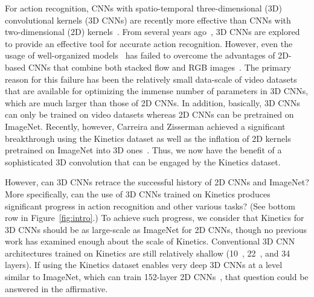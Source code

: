 \documentclass[10pt,twocolumn,letterpaper]{article}
\begin{document}
  For action recognition, CNNs with spatio-temporal three-dimensional (3D) convolutional kernels (3D CNNs)
  are recently more effective than CNNs with two-dimensional (2D) kernels~\cite{I3D}.
  From several years ago~\cite{Ji2013},
  3D CNNs are explored to provide an effective tool for accurate action recognition.
  However, even the usage of well-organized models~\cite{C3D,LongTermTemporalConv} has 
  failed to overcome the advantages of 2D-based CNNs that combine both stacked flow and RGB images~\cite{Simonyan2014}.
  The primary reason for this failure has been the relatively small data-scale of video datasets 
  that are available for optimizing the immense number of parameters in 3D CNNs, which are much larger than those of 2D CNNs.
  In addition, basically, 3D CNNs can only be trained on video datasets
  whereas 2D CNNs can be pretrained on ImageNet.
  Recently, however, Carreira and Zisserman achieved a significant breakthrough using the Kinetics dataset
  as well as the inflation of 2D kernels pretrained on ImageNet into 3D ones~\cite{I3D}.
  Thus, we now have the benefit of a sophisticated 3D convolution that can be engaged by the Kinetics dataset.
  
  However, can 3D CNNs retrace the successful history of 2D CNNs and ImageNet?
  More specifically, can the use of 3D CNNs trained on Kinetics produces significant progress in action recognition and other various tasks?
  (See bottom row in Figure~\ref{fig:intro}.)
  To achieve such progress, we consider that Kinetics for 3D CNNs should be as large-scale as ImageNet for 2D CNNs,
  though no previous work has examined enough about the scale of Kinetics.
  Conventional 3D CNN architectures trained on Kinetics are still relatively shallow
  (10~\cite{Kinetics}, 22~\cite{I3D}, and 34~\cite{Hara_2017_ICCV_Workshops,res3d} layers).
  If using the Kinetics dataset enables very deep 3D CNNs at a level similar to ImageNet, which can train 152-layer 2D CNNs~\cite{ResNet},
  that question could be answered in the affirmative.
\end{document}
